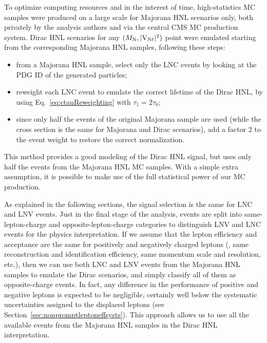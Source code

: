 To optimize computing resources and in the interest of time,
high-statistics MC samples were produced on a large scale for Majorana
HNL scenarios only, both privately by the analysis authors and via the
central CMS MC production system.
Dirac HNL scenarios for any $(M_{\mathrm{N}},\mathrm{|V_{\mathrm{N}\ell}|^2})$ point were emulated
starting from the corresponding Majorana HNL samples, following these
steps:
\begin{itemize}
\item from a Majorana HNL sample, select only the LNC events by
  looking at the PDG ID of the generated particles;
\item reweight each LNC event to emulate the correct lifetime of the
  Dirac HNL, by using Eq.~\ref{eq:ctauReweighting} with
  $\tau_1=2\tau_0$;
\item since only half the events of the original Majorana sample are
  used (while the cross section is the same for Majorana and Dirac
  scenarios), add a factor 2 to the event weight to restore the correct
  normalization.
\end{itemize}
This method provides a good modeling of the Dirac HNL signal, but
uses only half the events from the Majorana HNL MC samples. With a
simple extra assumption, it is possible to make use of the full
statistical power of our MC production.

As explained in the following sections, the signal selection is the
same for LNC and LNV events. Just in the final stage of the analysis,
events are split into same-lepton-charge and opposite-lepton-charge
categories to distinguish LNV and LNC events for the physics
interpretation. If we assume that the lepton efficiency and
acceptance are the same for positively and negatively charged leptons
(\ie, same reconstruction and identification efficiency, same momentum
scale and resolution, etc.), then we can use both LNC and LNV events
from the Majorana HNL samples to emulate the Dirac scenarios, and
simply classify all of them as opposite-charge events. In fact, any
difference in the performance of positive and negative leptons is
expected to be negligible, certainly well below the systematic
uncertainties assigned to the displaced leptons (see
Section~\ref{sec:nonpromptleptoneffsysts}).
This approach allows us to use all the available events from the
Majorana HNL samples in the Dirac HNL interpretation.

